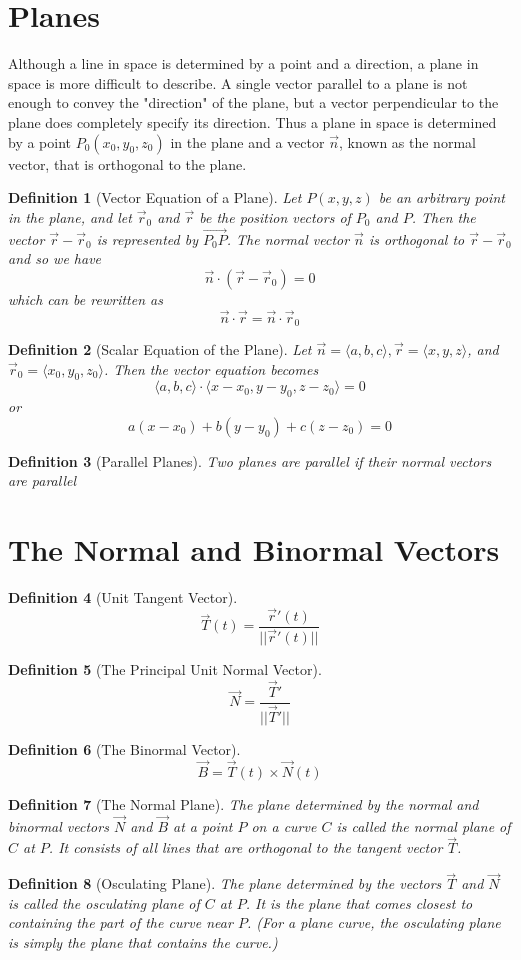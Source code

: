 \documentclass[10pt]{report}
\newtheorem{def2}{Definition}[section]
\begin{document}
\section{Planes}
Although a line in space is determined by a point and a direction, a plane in space is more difficult to describe. A single vector parallel to a plane is not enough to convey the "direction" of the plane, but a vector perpendicular to the plane does completely specify its direction. Thus a plane in space is determined by a point $P_0(x_0, y_0, z_0)$ in the plane and a vector $\vec{n}$, known as the normal vector,  that is orthogonal to the plane. 
\begin{def2}[Vector Equation of a Plane]
Let $P(x,y,z)$ be an arbitrary point in the plane, and let $\vec{r}_0$ and $\vec{r}$ be the position vectors of $P_0$ and $P$. Then the vector $\vec{r}-\vec{r}_0$ is represented by $\vec{P_0P}$. The normal vector $\vec{n}$ is orthogonal to $\vec{r}-\vec{r}_0$ and so we have
$$\vec{n}\cdot (\vec{r}-\vec{r}_0)= 0$$
which can be rewritten as
$$\vec{n}\cdot \vec{r} = \vec{n} \cdot \vec{r}_0$$
\end{def2}
\begin{def2}[Scalar Equation of the Plane]
Let $\vec{n}=\langle a,b,c\rangle, \vec{r} = \langle x,y,z\rangle$, and $\vec{r}_0 = \langle x_0, y_0, z_0\rangle$. Then the vector equation becomes
$$\langle a,b,c\rangle \cdot \langle x-x_0, y-y_0, z-z_0\rangle = 0$$
or
$$a(x-x_0) + b(y-y_0) + c(z-z_0) = 0$$
\end{def2}
\begin{def2}[Parallel Planes]
Two planes are parallel if their normal vectors are parallel
\end{def2}
\section{The Normal and Binormal Vectors}
\begin{def2}[Unit Tangent Vector]
$$\vec{T}(t) = \frac{\vec{r}'(t)}{||\vec{r}'(t)||}$$
\end{def2}
\begin{def2}[The Principal Unit Normal Vector]
$$\vec{N} = \frac{\vec{T}'}{||\vec{T}'||}$$
\end{def2}
\begin{def2}[The Binormal Vector]
$$\vec{B} = \vec{T}(t)\times\vec{N}(t)$$
\end{def2}
\begin{def2}[The Normal Plane]
The plane determined by the normal and binormal vectors $\vec{N}$ and $\vec{B}$ at a point $P$ on a curve $C$ is called the normal plane of $C$ at $P$. It consists of all lines that are orthogonal to the tangent vector $\vec{T}$. 
\end{def2}
\begin{def2}[Osculating Plane]
The plane determined by the vectors $\vec{T}$ and $\vec{N}$ is called the osculating plane of $C$ at $P$. It is the plane that comes closest to containing the part of the curve near $P$. (For a plane curve, the osculating plane is simply the plane that contains the curve.)
\end{def2}
\end{document}

